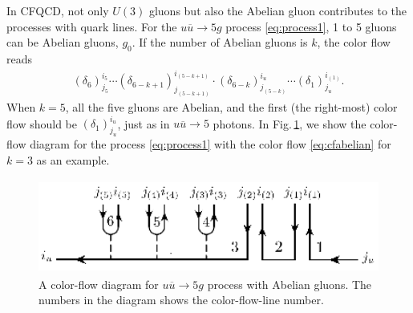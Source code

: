 \documentclass[a4paper,11pt]{article}
\begin{document}
In CFQCD, not only $U(3)$ gluons but also the Abelian gluon
contributes to the processes with quark lines. For the
$u\overline{u}\rightarrow 5g$ process \eqref{eq:process1}, 1 to 5
gluons can be Abelian gluons, $g_0$. If the number of Abelian
gluons is $k$, the color flow reads
\begin{align}
 (\delta_6)_{j_5}^{i_5}\cdots
 (\delta_{6-k+1})_{j_{(5-k+1)}}^{i_{(5-k+1)}}\cdot
 (\delta_{6-k})_{j_{(5-k)}}^{i_u}\cdots (\delta_1)_{j_u}^{i_{(1)}}.
 \label{eq:cfabelian}
\end{align}
When $k=5$, all the five gluons are Abelian, and the first (the right-most)
color flow should be $(\delta_1)_{j_u}^{i_u}$, just as in
$u\overline{u}\rightarrow 5$ photons. In Fig.\,\ref{fig:qqbar3g0cf}, we
show the color-flow diagram for the process \eqref{eq:process1} with
the color flow \eqref{eq:cfabelian} for $k=3$ as an
 example.
\begin{figure}
\begin{center}
\includegraphics[width=120mm,height=31mm]{./figures/qqbar3g0cf3.eps}
\caption{A color-flow diagram for $u\overline{u}\rightarrow
 5g$ process with Abelian gluons. The numbers in the diagram shows
 the
 color-flow-line number.}
\label{fig:qqbar3g0cf}
\end{center}
\end{figure}
\end{document}
